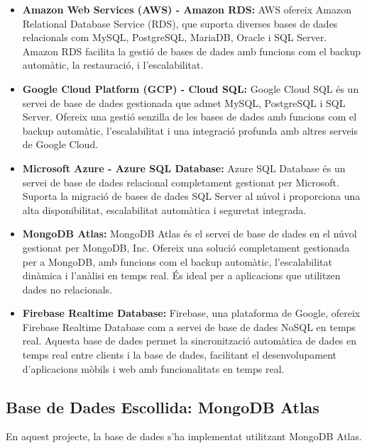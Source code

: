 \documentclass[a4paper,12pt,twoside]{ThesisStyle}
\begin{document}
\begin{itemize}
    \item \textbf{Amazon Web Services (AWS) - Amazon RDS:}
    AWS ofereix Amazon Relational Database Service (RDS), que suporta diverses bases de dades relacionals com MySQL, PostgreSQL, MariaDB, Oracle i SQL Server. Amazon RDS facilita la gestió de bases de dades amb funcions com el backup automàtic, la restauració, i l'escalabilitat.
    
    \item \textbf{Google Cloud Platform (GCP) - Cloud SQL:}
    Google Cloud SQL és un servei de base de dades gestionada que admet MySQL, PostgreSQL i SQL Server. Ofereix una gestió senzilla de les bases de dades amb funcions com el backup automàtic, l'escalabilitat i una integració profunda amb altres serveis de Google Cloud.
    
    \item \textbf{Microsoft Azure - Azure SQL Database:}
    Azure SQL Database és un servei de base de dades relacional completament gestionat per Microsoft. Suporta la migració de bases de dades SQL Server al núvol i proporciona una alta disponibilitat, escalabilitat automàtica i seguretat integrada.
    
    \item \textbf{MongoDB Atlas:}
    MongoDB Atlas és el servei de base de dades en el núvol gestionat per MongoDB, Inc. Ofereix una solució completament gestionada per a MongoDB, amb funcions com el backup automàtic, l'escalabilitat dinàmica i l'anàlisi en temps real. És ideal per a aplicacions que utilitzen dades no relacionals.
    
    \item \textbf{Firebase Realtime Database:}
    Firebase, una plataforma de Google, ofereix Firebase Realtime Database com a servei de base de dades NoSQL en temps real. Aquesta base de dades permet la sincronització automàtica de dades en temps real entre clients i la base de dades, facilitant el desenvolupament d'aplicacions mòbils i web amb funcionalitats en temps real.
\end{itemize}



\subsection{Base de Dades Escollida: MongoDB Atlas}
\label{Base de Dades Escollida: MongoDB Atlas}


En aquest projecte, la base de dades s'ha implementat utilitzant MongoDB Atlas.\\
\end{document}
